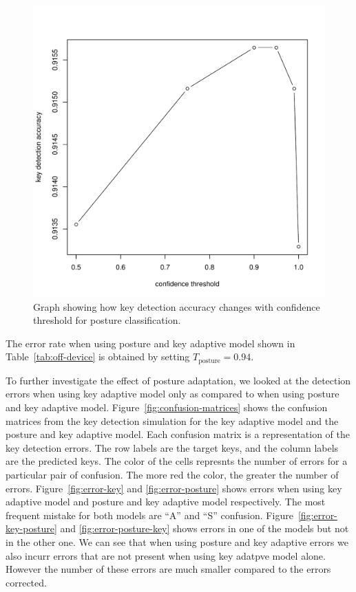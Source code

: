 \documentclass{sigchi}
\begin{document}
\begin{figure}[tb]
 \includegraphics[width=1\columnwidth]{figures/posture-confidence.pdf}
  \caption{Graph showing how key detection accuracy changes with confidence
  threshold for posture classification.}
  \label{fig:posture-confidence}
\end{figure}

The error rate when using posture and key adaptive model shown in Table~\ref{tab:off-device}
is obtained by setting $T_{\text{posture}} = 0.94$.

To further investigate the effect of posture adaptation, we looked at the detection
errors when using key adaptive model only as compared to when using posture and key adaptive model.
Figure~\ref{fig:confusion-matrices} shows the confusion matrices from the key detection
simulation for the key adaptive model and the posture and key adaptive model. Each 
confusion matrix is a representation of the key detection errors. The row labels are
the target keys, and the column labels are the predicted keys. The color of the cells
represnts the number of errors for a particular pair of confusion. The more red the color,
the greater the number of errors. Figure~\ref{fig:error-key} and \ref{fig:error-posture}
shows errors when using key adaptive model and posture and key adaptive model respectively.
The most frequent mistake for both models are ``A'' and ``S'' confusion. Figure~\ref{fig:error-key-posture}
and \ref{fig:error-posture-key} shows errors in one of the models but not in the other one.
We can see that when using posture and key adaptive errors we also incurr errors
that are not present when using key adatpve model alone. However the number of these
errors are much smaller compared to the errors corrected.
\end{document}
